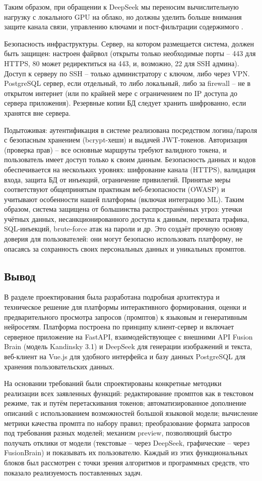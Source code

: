 Таким образом, при обращении к DeepSeek мы переносим вычислительную нагрузку
с локального GPU на облако, но должны уделить больше внимания защите канала связи,
управлению ключами и пост-фильтрации содержимого \cite{deepseek:docs}.

Безопасность инфраструктуры. Сервер, на котором размещается система, должен быть защищен: настроен файрвол (открыты только необходимые порты – 443 для HTTPS, 80 может редиректиться на 443, и, возможно, 22 для SSH админа). Доступ к серверу по SSH – только администратору с ключом, либо через VPN. PostgreSQL сервер, если отдельный, то либо локальный, либо за firewall – не в открытом интернет (или по крайней мере с ограничением по IP доступа до сервера приложения). Резервные копии БД следует хранить шифрованно, если хранятся вне сервера.

Подытоживая: аутентификация в системе реализована посредством логина/пароля с безопасным хранением (bcrypt-хеши) и выдачей JWT-токенов. Авторизация (проверка прав) – все основные маршруты требуют валидного токена, и пользователь имеет доступ только к своим данным. Безопасность данных и кодов обеспечивается на нескольких уровнях: шифрование канала (HTTPS), валидация входа, защита БД от инъекций, ограничение привилегий. Принятые меры соответствуют общепринятым практикам веб-безопасности (OWASP) и учитывают особенности нашей платформы (включая интеграцию ML). Таким образом, система защищена от большинства распространённых угроз: утечки учётных данных, несанкционированного доступа к данным, перехвата трафика, SQL-инъекций, brute-force атак на пароли и др. Это создаёт прочную основу доверия для пользователей: они могут безопасно использовать платформу, не опасаясь за сохранность своих персональных данных и уникальных промптов.
\subsection{Вывод}
В разделе проектирования была разработана подробная архитектура и техническое решение для платформы интерактивного формирования, оценки и предварительного просмотра запросов (промптов) к языковым и генеративным нейросетям. Платформа построена по принципу клиент-сервер и включает серверное приложение на FastAPI, взаимодействующее с внешними API Fusion Brain (модель Kandinsky 3.1) и DeepSeek для генерации изображений и текста, веб-клиент на Vue.js для удобного интерфейса и базу данных PostgreSQL для хранения пользовательских данных.

На основании требований были спроектированы конкретные методики реализации всех заявленных функций: редактирование промптов как в текстовом режиме, так и путём перетаскивания токенов; автоматизированное дополнение описаний с использованием возможностей большой языковой модели; вычисление метрики качества промпта по набору правил; преобразование формата запросов под требования разных моделей; механизм preview, позволяющий быстро получать отклики от модели (текстовые – через DeepSeek, графические – через FusionBrain) и показывать их пользователю. Каждый из этих функциональных блоков был рассмотрен с точки зрения алгоритмов и программных средств, что показало реализуемость поставленных задач.


